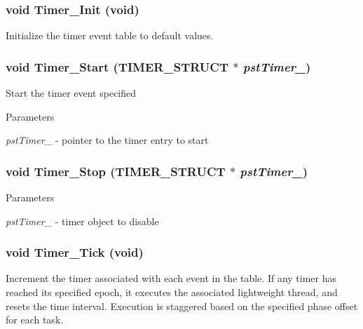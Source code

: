 \subsubsection[{Timer\_\-Init}]{\setlength{\rightskip}{0pt plus 5cm}void Timer\_\-Init (void)}\label{timer_8h_a92a70e2775796b1a7a6b49a983f570e3}
Initialize the timer event table to default values. 
\subsubsection[{Timer\_\-Start}]{\setlength{\rightskip}{0pt plus 5cm}void Timer\_\-Start ({\bf TIMER\_\-STRUCT} $\ast$ {\em pstTimer\_\-})}\label{timer_8h_a8940870986e55ac6eb91b4c4622fad9f}
Start the timer event specified


\begin{DoxyParams}{Parameters}
\item[{\em pstTimer\_\-}]-\/ pointer to the timer entry to start \end{DoxyParams}
\subsubsection[{Timer\_\-Stop}]{\setlength{\rightskip}{0pt plus 5cm}void Timer\_\-Stop ({\bf TIMER\_\-STRUCT} $\ast$ {\em pstTimer\_\-})}\label{timer_8h_a3771dd9a10f4f062cfe98adac397a659}

\begin{DoxyParams}{Parameters}
\item[{\em pstTimer\_\-}]-\/ timer object to disable \end{DoxyParams}
\subsubsection[{Timer\_\-Tick}]{\setlength{\rightskip}{0pt plus 5cm}void Timer\_\-Tick (void)}\label{timer_8h_ad5cae198aa59d9eafa2285e6f681e3b9}
Increment the timer associated with each event in the table. If any timer has reached its specified epoch, it executes the associated lightweight thread, and resets the time interval. Execution is staggered based on the specified phase offset for each task. 